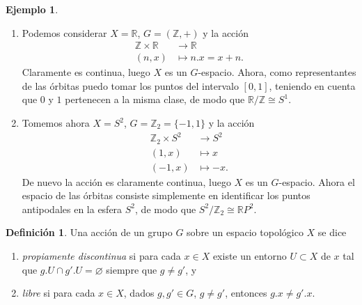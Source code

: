\documentclass[12pt,a4paper]{book}
\theoremstyle{definition} \newtheorem{defn}[thm]{Definición}
\theoremstyle{definition} \newtheorem{ejemplo}[thm]{Ejemplo}
\theoremstyle{definition} \newtheorem{ejercicio}[thm]{Ejercicio}
\theoremstyle{remark} \newtheorem*{obs}{Observación}
\def\ZZ{\mathbb{Z}}
\def\RR{\mathbb{R}}
\begin{document}
\begin{ejemplo}\leavevmode\label{circulo}
  \begin{enumerate}
\item Podemos considerar $X=\RR$, $G=(\ZZ,+)$ y la acción 
  \begin{align*}
     \ZZ\times \RR &\longrightarrow \RR\\ 
      (n,x) &\longmapsto n.x=x+n. 
    \end{align*}
    Claramente es continua, luego $X$ es un $G$-espacio. Ahora, como representantes de las órbitas puedo tomar los puntos del intervalo $[0,1]$, teniendo en cuenta que $0$ y $1$ pertenecen a la misma clase, de modo que $\RR/\ZZ\cong S^1$. 

  \item Tomemos ahora $X=S^2$, $G=\ZZ_2=\{-1,1\}$ y la acción
    \begin{align*}
       \ZZ_2\times S^2&\longrightarrow S^2\\ 
        (1,x) &\longmapsto x \\
        (-1,x) &\longmapsto -x.
      \end{align*}
      De nuevo la acción es claramente continua, luego $X$ es un $G$-espacio. Ahora el espacio de las órbitas consiste simplemente en identificar los puntos antipodales en la esfera $S^2$, de modo que $S^2/\ZZ_2\cong \RR P^2$.
  \end{enumerate} 
\end{ejemplo}
\begin{defn}
  Una acción de un grupo $G$ sobre un espacio topológico $X$ se dice 
  \begin{enumerate}
    \item \emph{propiamente discontinua} si para cada $x\in X$ existe un entorno $U\subset X$ de $x$ tal que $g.U\cap g'.U=\varnothing$ siempre que $g\neq g'$, y
    \item \emph{libre} si para cada $x \in X$, dados $g,g'\in G$, $g\neq g'$, entonces $g.x\neq g'.x$.
  \end{enumerate}
\end{defn}
\end{document}
